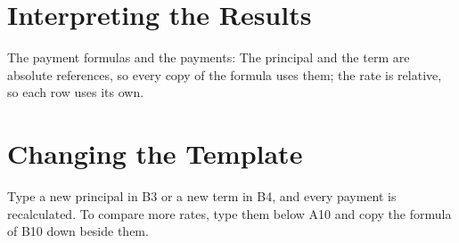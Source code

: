 \section{Interpreting the Results}
The payment formulas and the payments:
The principal and the term are absolute references, so every copy of the
formula uses them; the rate is relative, so each row uses its own.

\section{Changing the Template}
Type a new principal in B3 or a new term in B4, and every payment is
recalculated.  To compare more rates, type them below A10 and copy the
formula of B10 down beside them.
